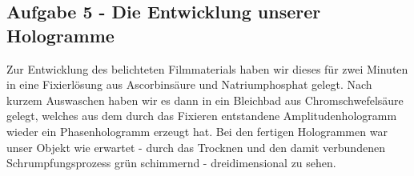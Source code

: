 \subsection*{Aufgabe 5 - Die Entwicklung unserer Hologramme}
Zur Entwicklung des belichteten Filmmaterials haben wir dieses für zwei Minuten in eine Fixierlösung aus Ascorbinsäure und Natriumphosphat gelegt. Nach kurzem Auswaschen haben wir es dann in ein Bleichbad aus Chromschwefelsäure gelegt, welches aus dem durch das Fixieren entstandene Amplitudenhologramm wieder ein Phasenhologramm erzeugt hat. Bei den fertigen Hologrammen war unser Objekt wie erwartet - durch das Trocknen und den damit verbundenen Schrumpfungsprozess grün schimmernd - dreidimensional zu sehen.